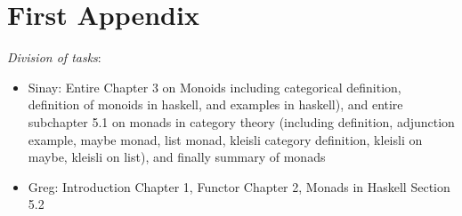 \appendix
\chapter{First Appendix}

\textit{Division of tasks}:
\begin{itemize}
    \item Sinay: Entire Chapter 3 on Monoids including categorical definition, definition of monoids in haskell, and examples in haskell), and entire subchapter 5.1 on monads in category theory (including definition, adjunction example, maybe monad, list monad, kleisli category definition, kleisli on maybe, kleisli on list), and finally summary of monads
    \item Greg: Introduction Chapter 1, Functor Chapter 2, Monads in Haskell Section 5.2
\end{itemize}